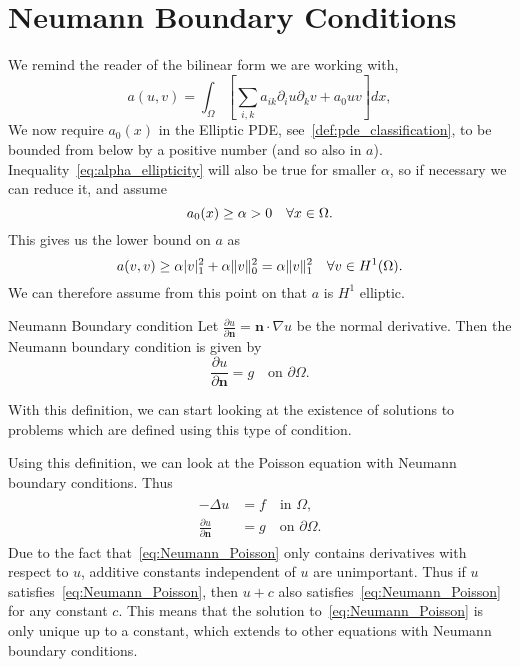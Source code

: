 \section{Neumann Boundary Conditions}
We remind the reader of the bilinear form we are working with,
\begin{equation}
   a(u,v) = \int_\Omega \left[\sum_{i,k} a_{ik}\partial_i u\partial_k v+a_0uv\right]dx,
\end{equation}
We now require $a_0(x)$ in the Elliptic PDE, see~\ref{def:pde_classification}, to be bounded from below by a positive number (and so also in $a$). 
Inequality~\eqref{eq:alpha_ellipticity} will also be true for smaller $\alpha$, so if 
necessary we can reduce it, and assume 
\begin{equation*}
  a_0(x) \geq \alpha >0 \quad \forall x \in \Omega.
\end{equation*}
This gives us the lower bound on $a$ as 
\begin{equation*}
   a(v,v)  \geq \alpha |v|^2_1 + \alpha \|v\|^2_0 = \alpha \|v\|^2_1 \quad \forall v \in H^1(\Omega).
\end{equation*}
We can therefore assume from this point on that $a$ is $H^1$ elliptic.

\begin{defn}{Neumann Boundary condition}
    Let $\frac{\partial u}{\partial \mathbf{n}}= \mathbf{n}\cdot \nabla u$ be the normal derivative. Then the Neumann boundary condition is given by
    \begin{equation}
        \frac{\partial u}{\partial \mathbf{n}}  = g\quad \text{on } \partial \Omega.
    \end{equation}
\end{defn}
With this definition, we can start looking at the existence of solutions to problems which are defined using this type of condition.

Using this definition, we can look at the Poisson equation with Neumann boundary conditions. Thus
\begin{align}
\label{eq:Neumann_Poisson}
\begin{split}
    -\Delta u &= f \quad \text{in } \Omega, \\
    \frac{\partial u}{\partial \mathbf{n}} &= g \quad \text{on } \partial \Omega.
\end{split}
\end{align}
Due to the fact that~\eqref{eq:Neumann_Poisson} only contains derivatives with respect to $u$,
 additive constants independent of $u$ are unimportant.
Thus if $u$ satisfies~\eqref{eq:Neumann_Poisson}, then $u + c$ also satisfies~\eqref{eq:Neumann_Poisson} for any constant $c$.
This means that the solution to~\eqref{eq:Neumann_Poisson} is only unique up to a constant,
 which extends to other equations with Neumann boundary conditions.

